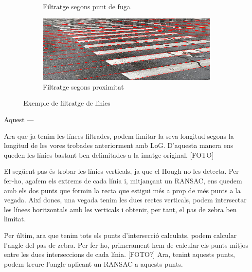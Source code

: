 \documentclass[10pt,a4paper,twocolumn,twoside]{article}
\begin{document}
\begin{figure}[!h]
\begin{subfigure}{0.45\columnwidth}
		\caption{Filtratge segons punt de fuga}
	\end{subfigure}
	\quad
	\begin{subfigure}{0.45\columnwidth}
		\includegraphics[width=\linewidth]{figs/filtrat_proximitat}
		\caption{Filtratge segons proximitat}
	\end{subfigure}
	\caption{Exemple de filtratge de línies}
	\label{fig:vores}
\end{figure}
Aquest   ---

Ara que ja tenim les línees filtrades, podem limitar la seva longitud segons la longitud de les vores trobades anteriorment amb LoG. D'aquesta manera ens queden les línies bastant ben delimitades a la imatge original. [FOTO]

El següent pas és trobar les línies verticals, ja que el Hough no les detecta. Per fer-ho, agafem els extrems de cada línia i, mitjançant un RANSAC, ens quedem amb els dos punts que formin la recta que estigui més a prop de més punts a la vegada. Així doncs, una vegada tenim les dues rectes verticals, podem intersectar les línees horitzontals amb les verticals i obtenir, per tant, el pas de zebra ben limitat.

Per últim, ara que tenim tots els punts d'intersecció calculats, podem calcular l'angle del pas de zebra. Per fer-ho, primerament hem de calcular els punts mitjos entre les dues interseccions de cada línia. [FOTO?] Ara, tenint aquests punts, podem treure l'angle aplicant un RANSAC a aquests punts.


\end{document}
